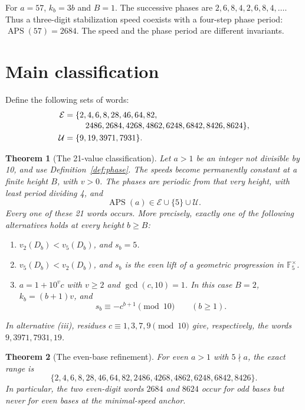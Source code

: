\documentclass[11pt,letterpaper]{article}
\numberwithin{equation}{section}
\newtheorem{theorem}{Theorem}[section]
\theoremstyle{definition}
\newcommand{\F}{\mathbb F}
\newcommand{\APS}{\operatorname{APS}}
\newcommand{\Eset}{\mathcal E}
\newcommand{\Uset}{\mathcal U}
\begin{document}
For $a=57$, $k_b=3b$ and $B=1$. The successive phases are
$2,6,8,4,2,6,8,4,\ldots$. Thus a three-digit stabilization speed coexists with
a four-step phase period: $\APS(57)=2684$. The speed and the phase period are
different invariants.

\section{Main classification}
Define the following sets of words:
\begin{align}
 \Eset={}&\{2,4,6,8,28,46,64,82,\notag\\[-2pt]
 &\hspace{1.2em}2486,2684,4268,4862,6248,6842,8426,8624\},\label{eq:Eset}\\
 \Uset={}&\{9,19,3971,7931\}.\label{eq:Uset}
\end{align}

\begin{theorem}[The 21-value classification]\label{thm:main}
Let $a>1$ be an integer not divisible by 10, and use
Definition~\ref{def:phase}. The speeds become permanently constant at a finite
height $B$, with $v>0$. The phases are periodic from that very height, with
least period dividing 4, and
\begin{equation}\label{eq:mainset}
 \APS(a)\in \Eset\cup\{5\}\cup\Uset.
\end{equation}
Every one of these 21 words occurs. More precisely, exactly one of the
following alternatives holds at every height $b\geq B$:
\begin{enumerate}[label=\textup{(\roman*)},leftmargin=2em,itemsep=2pt]
\item $v_2(D_b)<v_5(D_b)$, and $s_b=5$.
\item $v_5(D_b)<v_2(D_b)$, and $s_b$ is the even lift of a geometric
      progression in $\F_5^\times$.
\item $a=1+10^v c$ with $v\geq2$ and $\gcd(c,10)=1$. In this case
      $B=2$, $k_b=(b+1)v$, and
      \begin{equation}\label{eq:balancedphase}
      s_b\equiv-c^{b+1}\pmod {10}\qquad(b\geq1).
      \end{equation}
\end{enumerate}
In alternative \textup{(iii)}, residues $c\equiv1,3,7,9\pmod {10}$ give,
respectively, the words $9,3971,7931,19$.
\end{theorem}

\begin{theorem}[The even-base refinement]\label{thm:even}
For even $a>1$ with $5\nmid a$, the exact range is
\begin{equation}\label{eq:evenset}
 \{2,4,6,8,28,46,64,82,2486,4268,4862,6248,6842,8426\}.
\end{equation}
In particular, the two even-digit words $2684$ and $8624$ occur for odd bases
but never for even bases at the minimal-speed anchor.
\end{theorem}
\end{document}
